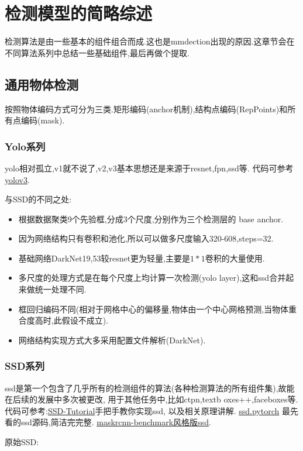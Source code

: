 \documentclass[UTF8]{ctexart}
\begin{document}
\section{检测模型的简略综述}
检测算法是由一些基本的组件组合而成.这也是mmdection出现的原因.这章节会在不同算法系列中总结一些基础组件,最后再做个提取.
\subsection{通用物体检测}
按照物体编码方式可分为三类.矩形编码(anchor机制),结构点编码(RepPoints)和所有点编码(mask).
\subsubsection{Yolo系列}
yolo相对孤立,v1就不说了,v2,v3基本思想还是来源于resnet,fpn,ssd等.
代码可参考 \href{https://github.com/ultralytics/yolov3}{yolov3}.

与SSD的不同之处:
\begin{itemize}
	\item 根据数据聚类9个先验框,分成3个尺度,分别作为三个检测层的 base anchor.
	\item 因为网络结构只有卷积和池化,所以可以做多尺度输入320-608,steps=32.
	\item 基础网络DarkNet19,53较resnet更为轻量,主要是$1*1$卷积的大量使用.
	\item 多尺度的处理方式是在每个尺度上均计算一次检测(yolo layer),这和ssd合并起来做统一处理不同.
	\item 框回归编码不同(相对于网格中心的偏移量,物体由一个中心网格预测,当物体重合度高时,此假设不成立).
	\item 网络结构实现方式大多采用配置文件解析(DarkNet).
\end{itemize}

\subsubsection{SSD系列}
ssd是第一个包含了几乎所有的检测组件的算法(各种检测算法的所有组件集),故能在后续的发展中多次被更改,
用于其他任务中,比如ctpn,textb
oxes++,faceboxes等.代码可参考:\href{https://github.com/sgrvinod/a-PyTorch-Tutorial-to-Object-Detection}{SSD-Tutorial}手把手教你实现ssd,
以及相关原理讲解. \href{https://github.com/amdegroot/ssd.pytorch}{ssd.pytorch} 
最先看的ssd源码,简洁完完整.
\href{https://github.com/lufficc/SSD}{maskrcnn-benchmark风格版ssd}.

原始SSD:
\end{document}
